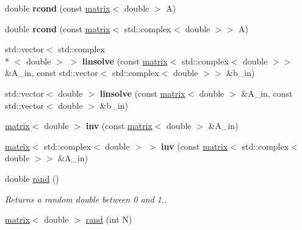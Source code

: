 \begin{DoxyCompactItemize}
\item 
\hypertarget{namespacekeycpp_a08b7545ff5c1295647680d08f2953875}{double {\bfseries rcond} (const \hyperlink{classkeycpp_1_1matrix}{matrix}$<$ double $>$ A)}\label{namespacekeycpp_a08b7545ff5c1295647680d08f2953875}

\item 
\hypertarget{namespacekeycpp_a5cc586899ece36154e39201f18e6db55}{double {\bfseries rcond} (const \hyperlink{classkeycpp_1_1matrix}{matrix}$<$ std\-::complex$<$ double $>$$>$ A)}\label{namespacekeycpp_a5cc586899ece36154e39201f18e6db55}

\item 
\hypertarget{namespacekeycpp_a9f68b3d9143ad3582e59dd0a4b1998b8}{std\-::vector$<$ std\-::complex\\*
$<$ double $>$ $>$ {\bfseries linsolve} (const \hyperlink{classkeycpp_1_1matrix}{matrix}$<$ std\-::complex$<$ double $>$$>$ \&A\-\_\-in, const std\-::vector$<$ std\-::complex$<$ double $>$$>$ \&b\-\_\-in)}\label{namespacekeycpp_a9f68b3d9143ad3582e59dd0a4b1998b8}

\item 
\hypertarget{namespacekeycpp_a46f4a25648e5bad1cf0bd0e7fca7fae0}{std\-::vector$<$ double $>$ {\bfseries linsolve} (const \hyperlink{classkeycpp_1_1matrix}{matrix}$<$ double $>$ \&A\-\_\-in, const std\-::vector$<$ double $>$ \&b\-\_\-in)}\label{namespacekeycpp_a46f4a25648e5bad1cf0bd0e7fca7fae0}

\item 
\hypertarget{namespacekeycpp_adc96927cda2df7a6e8e2031941c43601}{\hyperlink{classkeycpp_1_1matrix}{matrix}$<$ double $>$ {\bfseries inv} (const \hyperlink{classkeycpp_1_1matrix}{matrix}$<$ double $>$ \&A\-\_\-in)}\label{namespacekeycpp_adc96927cda2df7a6e8e2031941c43601}

\item 
\hypertarget{namespacekeycpp_a6b74369f5415c3ed45f63995149ad992}{\hyperlink{classkeycpp_1_1matrix}{matrix}$<$ std\-::complex$<$ double $>$ $>$ {\bfseries inv} (const \hyperlink{classkeycpp_1_1matrix}{matrix}$<$ std\-::complex$<$ double $>$$>$ \&A\-\_\-in)}\label{namespacekeycpp_a6b74369f5415c3ed45f63995149ad992}

\item 
\hypertarget{namespacekeycpp_a5ef5c1f5951e8182a7c4ec9612f3f7e1}{double \hyperlink{namespacekeycpp_a5ef5c1f5951e8182a7c4ec9612f3f7e1}{rand} ()}\label{namespacekeycpp_a5ef5c1f5951e8182a7c4ec9612f3f7e1}

\begin{DoxyCompactList}\small\item\em Returns a random double between 0 and 1.. \end{DoxyCompactList}\item 
\hypertarget{namespacekeycpp_a53e0eb41dbd6cddc6ac15d92d68c7aee}{\hyperlink{classkeycpp_1_1matrix}{matrix}$<$ double $>$ \hyperlink{namespacekeycpp_a53e0eb41dbd6cddc6ac15d92d68c7aee}{rand} (int N)}\label{namespacekeycpp_a53e0eb41dbd6cddc6ac15d92d68c7aee}


\end{DoxyCompactItemize}
